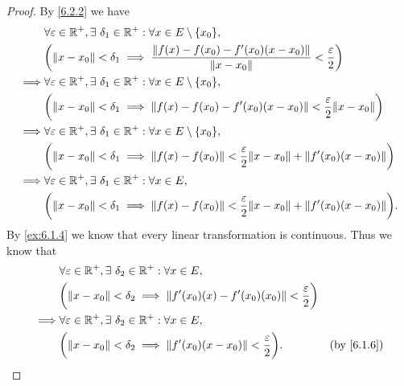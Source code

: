 \begin{proof}
  By \cref{6.2.2} we have
  \begin{align*}
             & \forall \varepsilon \in \R^+, \exists\ \delta_1 \in \R^+ : \forall x \in E \setminus \{x_0\},                                             \\
             & \bigg(\norm*{x - x_0} < \delta_1 \implies \frac{\norm*{f(x) - f(x_0) - f'(x_0)(x - x_0)}}{\norm*{x - x_0}} < \frac{\varepsilon}{2}\bigg)  \\
    \implies & \forall \varepsilon \in \R^+, \exists\ \delta_1 \in \R^+ : \forall x \in E \setminus \{x_0\},                                             \\
             & \bigg(\norm*{x - x_0} < \delta_1 \implies \norm*{f(x) - f(x_0) - f'(x_0)(x - x_0)} < \frac{\varepsilon}{2} \norm*{x - x_0}\bigg)          \\
    \implies & \forall \varepsilon \in \R^+, \exists\ \delta_1 \in \R^+ : \forall x \in E \setminus \{x_0\},                                             \\
             & \bigg(\norm*{x - x_0} < \delta_1 \implies \norm*{f(x) - f(x_0)} < \frac{\varepsilon}{2} \norm*{x - x_0} + \norm*{f'(x_0)(x - x_0)}\bigg)  \\
    \implies & \forall \varepsilon \in \R^+, \exists\ \delta_1 \in \R^+ : \forall x \in E,                                                               \\
             & \bigg(\norm*{x - x_0} < \delta_1 \implies \norm*{f(x) - f(x_0)} < \frac{\varepsilon}{2} \norm*{x - x_0} + \norm*{f'(x_0)(x - x_0)}\bigg).
  \end{align*}
  By \cref{ex:6.1.4} we know that every linear transformation is continuous.
  Thus we know that
  \begin{align*}
             & \forall \varepsilon \in \R^+, \exists\ \delta_2 \in \R^+ : \forall x \in E,                                                          \\
             & \bigg(\norm*{x - x_0} < \delta_2 \implies \norm*{f'(x_0)(x) - f'(x_0)(x_0)} < \frac{\varepsilon}{2}\bigg)                            \\
    \implies & \forall \varepsilon \in \R^+, \exists\ \delta_2 \in \R^+ : \forall x \in E,                                                          \\
             & \bigg(\norm*{x - x_0} < \delta_2 \implies \norm*{f'(x_0)(x - x_0)} < \frac{\varepsilon}{2}\bigg).         & \text{(by \cref{6.1.6})}
  \end{align*}

\end{proof}
